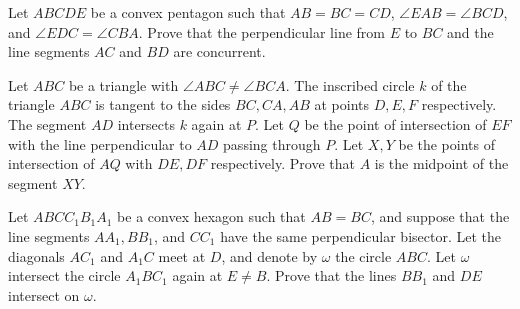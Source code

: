 \documentclass{article}
\begin{document}
\begin{prob}[ISL 2017/G1]{6}
Let $ABCDE$ be a convex pentagon such that $AB=BC=CD$, $\angle{EAB}=\angle{BCD}$, and $\angle{EDC}=\angle{CBA}$. Prove that the perpendicular line from $E$ to $BC$ and the line segments $AC$ and $BD$ are concurrent.
\end{prob}

\begin{prob}{6}
Let $ABC$ be a triangle with $\angle  ABC \ne \angle  BCA$. The inscribed circle $k$ of the triangle $ABC$ is tangent to the sides $BC, CA,AB$ at points $D, E , F$ respectively. The segment $AD$ intersects $k$ again at $P$. Let $Q$ be the point of intersection of $EF$ with the line perpendicular to $AD$ passing through $P$. Let $X,Y$ be the points of intersection of $AQ$ with $DE,DF$ respectively. Prove that $A$ is the midpoint of the segment $XY$.
\end{prob}

\begin{prob}[ISL 2017 G5]{7}
Let $ABCC_1B_1A_1$ be a convex hexagon such that $AB=BC$, and suppose that the line segments $AA_1, BB_1$, and $CC_1$ have the same perpendicular bisector. Let the diagonals $AC_1$ and $A_1C$ meet at $D$, and denote by $\omega$ the circle $ABC$. Let $\omega$ intersect the circle $A_1BC_1$ again at $E \neq B$. Prove that the lines $BB_1$ and $DE$ intersect on $\omega$.
\end{prob}
\end{document}
